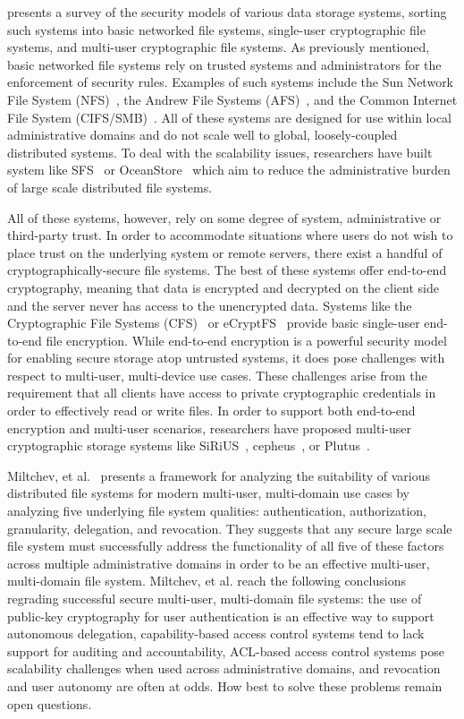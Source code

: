 \cite{kher2005} presents a survey of the security models of various
data storage systems, sorting such systems into basic networked file
systems, single-user cryptographic file systems, and multi-user
cryptographic file systems. As previously mentioned, basic networked
file systems rely on trusted systems and administrators for the
enforcement of security rules. Examples of such systems include the
Sun Network File System (NFS)~\cite{sandberg1985}, the Andrew File
Systems (AFS)~\cite{howard1988}, and the Common Internet File System
(CIFS/SMB)~\cite{microsoft-smb2}. All of these systems are designed
for use within local administrative domains and do not scale well to
global, loosely-coupled distributed systems. To deal with the
scalability issues, researchers have built system like
SFS~\cite{mazieres1999} or OceanStore~\cite{kubiatowicz2000} which aim
to reduce the administrative burden of large scale distributed file
systems.

All of these systems, however, rely on some degree of system,
administrative or third-party trust. In order to accommodate
situations where users do not wish to place trust on the underlying
system or remote servers, there exist a handful of
cryptographically-secure file systems. The best of these systems offer
end-to-end cryptography, meaning that data is encrypted and decrypted
on the client side and the server never has access to the unencrypted
data.  Systems like the Cryptographic File Systems
(CFS)~\cite{blaze1993} or eCryptFS~\cite{ecryptfs} provide basic
single-user end-to-end file encryption. While end-to-end encryption is
a powerful security model for enabling secure storage atop untrusted
systems, it does pose challenges with respect to multi-user,
multi-device use cases. These challenges arise from the requirement
that all clients have access to private cryptographic credentials in
order to effectively read or write files. In order to support both
end-to-end encryption and multi-user scenarios, researchers have
proposed multi-user cryptographic storage systems like
SiRiUS~\cite{goh2003}, cepheus~\cite{fu1998}, or
Plutus~\cite{kallahalla2003}.

Miltchev, et al.~\cite{miltchev2008} presents a framework for
analyzing the suitability of various distributed file systems for
modern multi-user, multi-domain use cases by analyzing five underlying
file system qualities: authentication, authorization, granularity,
delegation, and revocation. They suggests that any secure large scale
file system must successfully address the functionality of all five of
these factors across multiple administrative domains in order to be an
effective multi-user, multi-domain file system. Miltchev, et al. reach
the following conclusions regrading successful secure multi-user,
multi-domain file systems: the use of public-key cryptography for user
authentication is an effective way to support autonomous delegation,
capability-based access control systems tend to lack support for
auditing and accountability, ACL-based access control systems pose
scalability challenges when used across administrative domains, and
revocation and user autonomy are often at odds. How best to solve
these problems remain open questions.

